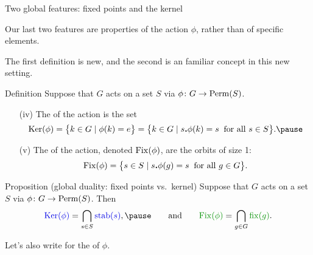 \documentclass[8pt, handout]{beamer}
\newcommand{\Pause}{\pause}      %
\begin{document}
\begin{frame}{Two global features: fixed points and the kernel} 

  Our last two features are properties of the action $\phi$, rather than of
  specific elements.
  
  \medskip\Pause
  
  The first definition is new, and the second is an familiar concept
  in this new setting. \Pause
  
  \begin{block}{Definition}
    Suppose that $G$ acts on a set $S$ via $\phi\colon G\to\operatorname{Perm}(S)$.  \Pause
    \begin{enumerate}[(i)]
    \item[(iv)] The  of the action is the set
      \[
      \Ker(\phi)=\big\{k\in G\mid\phi(k)=e\big\}=\big\{k\in G\mid s\Dot\phi(k)
      =s\;\;\text{for all } s\in S\big\}. \Pause
      \]
      \vspace{-3mm}
    \item[(v)] The  of the action, denoted
      $\operatorname{Fix}(\phi)$, are the orbits of size 1:
      \[
      \operatorname{Fix}(\phi)=\big\{s\in S\mid s\bm{.}\phi(g)
      =s\;\;\text{for all } g\in G\big\}.
      \]
    \end{enumerate}
  \end{block}
  
  \vspace{-1mm}\Pause
  
  \begin{block}{Proposition (global duality: fixed points vs.\ kernel)}
    Suppose that $G$ acts on a set $S$ via $\phi\colon G\to\operatorname{Perm}(S)$. \Pause
    Then
    \[
    \Balert{\Ker(\phi)}=\bigcap_{s\in
      S}\Balert{\stab(s)},\Pause\qquad\text{and}\qquad
    \Galert{\Fix(\phi)}=\bigcap_{g\in G}\Galert{\fix(g)}.
    \]
    \vspace{-2mm}
  \end{block}
  
  \smallskip\Pause
  
  Let's also write \Alert{$\Orb(\phi)$} for the 
  of $\phi$.

\end{frame}

\end{document}
